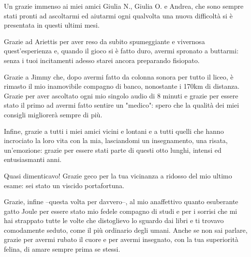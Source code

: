 \bigskip \noindent
Un grazie immenso ai miei amici Giulia N., Giulia O. e Andrea, che sono sempre stati pronti ad ascoltarmi ed aiutarmi ogni qualvolta una nuova difficoltà si è presentata in questi ultimi mesi.

\bigskip \noindent
Grazie ad Ariettis per aver reso da subito spumeggiante e vivernosa quest'esperienza e, quando il gioco si è fatto duro, avermi spronato a buttarmi: senza i tuoi incitamenti adesso starei ancora preparando fisiopato.

\bigskip \noindent
Grazie a Jimmy che, dopo avermi fatto da colonna sonora per tutto il liceo, è rimasto il mio inamovibile compagno di banco, nonostante i 170km di distanza. Grazie per aver ascoltato ogni mio singolo audio di 8 minuti e grazie per essere stato il primo ad avermi fatto sentire un "medico": spero che la qualità dei miei consigli migliorerà sempre di più. 

\bigskip\noindent
Infine, grazie a tutti i miei amici vicini e lontani e a tutti quelli che hanno incrociato la loro vita con la mia, lasciandomi un insegnamento, una risata, un'emozione: grazie per essere stati parte di questi otto lunghi, intensi ed entusiasmanti anni.

\bigskip\noindent
Quasi dimenticavo! Grazie geco per la tua vicinanza a ridosso del mio ultimo esame: sei stato un viscido portafortuna. 

\bigskip\noindent
Grazie, infine --questa volta per davvero--, al mio anaffettivo quanto esuberante gatto Joule per essere stato mio fedele compagno di studi e per i sorrisi che mi hai strappato tutte le volte che distoglievo lo sguardo dai libri e ti trovavo comodamente seduto, come il più ordinario degli umani. Anche se non sai parlare, grazie per avermi rubato il cuore e per avermi insegnato, con la tua superiorità felina, di amare sempre prima se stessi.  